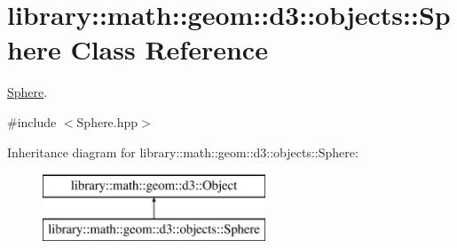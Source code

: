 \hypertarget{classlibrary_1_1math_1_1geom_1_1d3_1_1objects_1_1_sphere}{}\section{library\+:\+:math\+:\+:geom\+:\+:d3\+:\+:objects\+:\+:Sphere Class Reference}
\label{classlibrary_1_1math_1_1geom_1_1d3_1_1objects_1_1_sphere}


\hyperlink{classlibrary_1_1math_1_1geom_1_1d3_1_1objects_1_1_sphere}{Sphere}.  




{\ttfamily \#include $<$Sphere.\+hpp$>$}

Inheritance diagram for library\+:\+:math\+:\+:geom\+:\+:d3\+:\+:objects\+:\+:Sphere\+:\begin{figure}[H]
\begin{center}
\leavevmode
\includegraphics[height=2.000000cm]{classlibrary_1_1math_1_1geom_1_1d3_1_1objects_1_1_sphere}
\end{center}
\end{figure}
